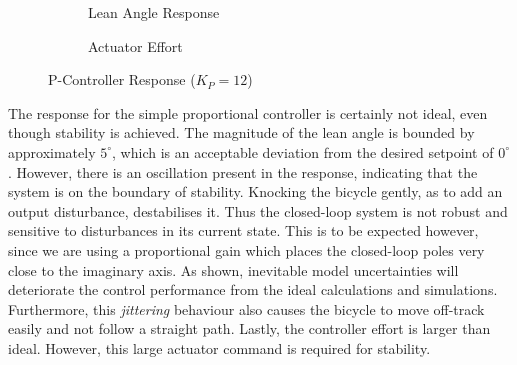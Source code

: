 \begin{figure}[H]
	\begin{subfigure}{0.5\textwidth}
	\caption{Lean Angle Response}
	\end{subfigure} \hspace{1mm}
	\begin{subfigure}{0.5\textwidth}
	\caption{Actuator Effort}
	\end{subfigure}
	\caption{P-Controller Response ($K_P=12$)}
	\label{fig:LegoPController}
\end{figure}

The response for the simple proportional controller is certainly not ideal, even though stability is achieved.  The magnitude of the lean angle is bounded by approximately $5^{\circ}$, which is an acceptable deviation from the desired setpoint of $0^{\circ}$. However, there is an oscillation present in the response, indicating that the system is on the boundary of stability. Knocking the bicycle gently, as to add an output disturbance, destabilises it. Thus the closed-loop system is not robust and sensitive to disturbances in its current state. This is to be expected however, since we are using a proportional gain which places the closed-loop poles very close to the imaginary axis. As shown, inevitable model uncertainties will deteriorate the control performance from the ideal calculations and simulations. Furthermore, this \textit{jittering} behaviour also causes the bicycle to move off-track easily and not follow a straight path. Lastly, the controller effort is larger than ideal. However, this large actuator command is required for stability. \\

